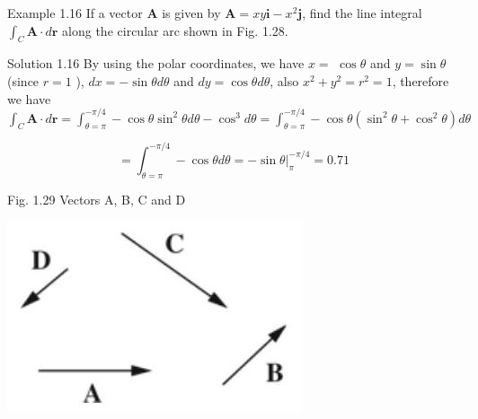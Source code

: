 \documentclass[10pt]{article}
\begin{document}
Example 1.16 If a vector $\mathbf{A}$ is given by $\mathbf{A}=x y \mathbf{i}-x^{2} \mathbf{j}$, find the line integral $\int_{C} \mathbf{A} \cdot d \mathbf{r}$ along the circular arc shown in Fig. 1.28.

Solution 1.16 By using the polar coordinates, we have $x=$ $\cos \theta$ and $y=\sin \theta$ (since $r=1$ ), $d x=-\sin \theta d \theta$ and $d y=\cos \theta d \theta$, also $x^{2}+y^{2}=r^{2}=1$, therefore we have $\int_{C} \mathbf{A} \cdot d \mathbf{r}=\int_{\theta=\pi}^{-\pi / 4}-\cos \theta \sin ^{2} \theta d \theta-\cos ^{3} d \theta=\int_{\theta=\pi}^{-\pi / 4}-\cos \theta\left(\sin ^{2} \theta+\cos ^{2} \theta\right) d \theta$

$$
=\int_{\theta=\pi}^{-\pi / 4}-\cos \theta d \theta=-\left.\sin \theta\right|_{\pi} ^{-\pi / 4}=0.71
$$

Fig. 1.29 Vectors A, B, C and D

\begin{center}
\includegraphics[max width=\textwidth]{2024_09_13_db1f357d2aad0a03eb2eg-025}
\end{center}
\end{document}
